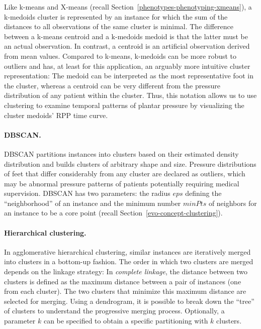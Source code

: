 \documentclass[
  oneside]{book}
\begin{document}
Like k-means and X-means (recall Section~\ref{phenotypes-phenotyping-xmeans}), a k-medoids cluster is represented by an instance for which the sum of the distances to all observations of the same cluster is minimal.
The difference between a k-means centroid and a k-medoids medoid is that the latter must be an actual observation.
In contrast, a centroid is an artificial observation derived from mean values.
Compared to k-means, k-medoids can be more robust to outliers \autocite{SinghEtAl:k-meansMedoidsComparison2011} and has, at least for this application, an arguably more intuitive cluster representation: The
medoid can be interpreted as the most representative foot in the cluster, whereas a centroid can be very different from the pressure distribution of any patient within the cluster.
Thus, this notation allows us to use clustering to examine temporal patterns of plantar pressure by visualizing the cluster medoids' RPP time curve.

\paragraph*{DBSCAN.}

DBSCAN \autocite{EsterEtAl:DBSCAN96} partitions instances into clusters based on their estimated density distribution and builds clusters of arbitrary shape and size. Pressure distributions of feet that differ considerably from any cluster are declared as outliers, which may be abnormal pressure patterns of patients potentially requiring medical supervision.
DBSCAN has two parameters: the radius \(eps\) defining the ``neighborhood'' of an instance and the minimum number \(minPts\) of neighbors for an instance to be a core point (recall Section~\ref{evo-concept-clustering}).

\paragraph*{Hierarchical clustering.}

In agglomerative hierarchical clustering, similar instances are iteratively merged into clusters in a bottom-up fashion.
The order in which two clusters are merged depends on the linkage strategy: In \emph{complete linkage}, the distance between two clusters is defined as the maximum distance between a pair of instances (one from each cluster).
The two clusters that minimize this maximum distance are selected for merging.
Using a dendrogram, it is possible to break down the ``tree'' of clusters to understand the progressive merging process.
Optionally, a parameter \(k\) can be specified to obtain a specific partitioning with \(k\) clusters.
\end{document}

